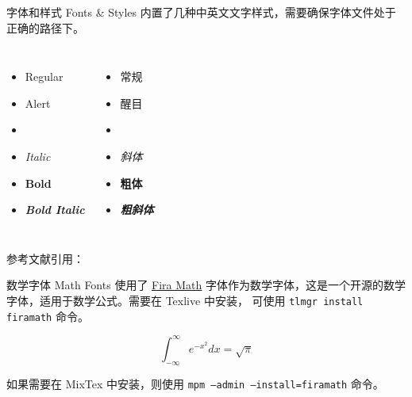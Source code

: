 \documentclass[10pt,aspectratio=169,fontset=none]{ctexbeamer}
\begin{document}
    \begin{frame}{字体和样式 Fonts \& Styles}
        内置了几种中英文文字样式，需要确保字体文件处于正确的路径下。
        \begin{columns}
            \begin{itemize}
                \item Regular
                \item \alert{Alert}
                \item {}
                \item \textit{Italic}
                \item \textbf{Bold}
                \item \textbf{\textit{Bold Italic}}
            \end{itemize}
            \begin{itemize}
                \item 常规
                \item \alert{醒目}
                \item {}
                \item \textit{斜体}
                \item \textbf{粗体}
                \item \textbf{\textit{粗斜体}}
            \end{itemize}
        \end{columns}
        \vspace*{1em}
        参考文献引用：\cite{Mosher2013} \cite{Asgharzadeh2008} 
    \end{frame}

    \begin{frame}{数学字体 Math Fonts}
        使用了 \href{https://github.com/firamath/firamath}{Fira Math} 字体作为数学字体，这是一个开源的数学字体，适用于数学公式。需要在 Texlive 中安装， 可使用 \texttt{\alert{tlmgr} install firamath} 命令。

        \begin{equation}
            \int_{-\infty}^{\infty} e^{-x^2} dx = \sqrt{\pi}
        \end{equation}

        如果需要在 MixTex 中安装，则使用 \texttt{\alert{mpm} --admin --install=firamath} 命令。

    \end{frame}
\end{document}
